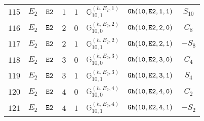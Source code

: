 \documentclass[fleqn,8pt]{jsarticle}
\begin{document}
\begin{table}[ht!]
\begin{center}
\begin{tabular}{cccccccc}
$ 115 $ & $ E_{2} $ & $ {\tt E2} $ & $ 1 $ & $ 1 $ & $ \mathbb{G}_{10,1}^{(h,E_{2},1)} $ & $ {\tt Gh(10,E2,1,1)} $ & $ S_{10} $ \\
$ 116 $ & $ E_{2} $ & $ {\tt E2} $ & $ 2 $ & $ 0 $ & $ \mathbb{G}_{10,0}^{(h,E_{2},2)} $ & $ {\tt Gh(10,E2,2,0)} $ & $ C_{8} $ \\
$ 117 $ & $ E_{2} $ & $ {\tt E2} $ & $ 2 $ & $ 1 $ & $ \mathbb{G}_{10,1}^{(h,E_{2},2)} $ & $ {\tt Gh(10,E2,2,1)} $ & $ - S_{8} $ \\
$ 118 $ & $ E_{2} $ & $ {\tt E2} $ & $ 3 $ & $ 0 $ & $ \mathbb{G}_{10,0}^{(h,E_{2},3)} $ & $ {\tt Gh(10,E2,3,0)} $ & $ C_{4} $ \\
$ 119 $ & $ E_{2} $ & $ {\tt E2} $ & $ 3 $ & $ 1 $ & $ \mathbb{G}_{10,1}^{(h,E_{2},3)} $ & $ {\tt Gh(10,E2,3,1)} $ & $ S_{4} $ \\
$ 120 $ & $ E_{2} $ & $ {\tt E2} $ & $ 4 $ & $ 0 $ & $ \mathbb{G}_{10,0}^{(h,E_{2},4)} $ & $ {\tt Gh(10,E2,4,0)} $ & $ C_{2} $ \\
$ 121 $ & $ E_{2} $ & $ {\tt E2} $ & $ 4 $ & $ 1 $ & $ \mathbb{G}_{10,1}^{(h,E_{2},4)} $ & $ {\tt Gh(10,E2,4,1)} $ & $ - S_{2} $ \\
 \hline \hline
\end{tabular}
\end{center}
\end{table}
\end{document}
